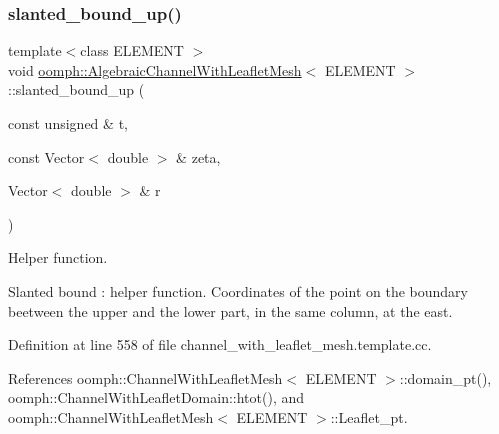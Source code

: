 \mbox{\label{classoomph_1_1AlgebraicChannelWithLeafletMesh_ab3659949ea5faac4ffa981828e98cf53}} 
\subsubsection{\texorpdfstring{slanted\+\_\+bound\+\_\+up()}{slanted\_bound\_up()}}
{\footnotesize\ttfamily template$<$class E\+L\+E\+M\+E\+NT $>$ \\
void \hyperlink{classoomph_1_1AlgebraicChannelWithLeafletMesh}{oomph\+::\+Algebraic\+Channel\+With\+Leaflet\+Mesh}$<$ E\+L\+E\+M\+E\+NT $>$\+::slanted\+\_\+bound\+\_\+up (\begin{DoxyParamCaption}\item[{const unsigned \&}]{t,  }\item[{const Vector$<$ double $>$ \&}]{zeta,  }\item[{Vector$<$ double $>$ \&}]{r }\end{DoxyParamCaption})\hspace{0.3cm}{\ttfamily [protected]}}



Helper function. 

Slanted bound \+: helper function. Coordinates of the point on the boundary beetween the upper and the lower part, in the same column, at the east. 

Definition at line 558 of file channel\+\_\+with\+\_\+leaflet\+\_\+mesh.\+template.\+cc.



References oomph\+::\+Channel\+With\+Leaflet\+Mesh$<$ E\+L\+E\+M\+E\+N\+T $>$\+::domain\+\_\+pt(), oomph\+::\+Channel\+With\+Leaflet\+Domain\+::htot(), and oomph\+::\+Channel\+With\+Leaflet\+Mesh$<$ E\+L\+E\+M\+E\+N\+T $>$\+::\+Leaflet\+\_\+pt.

\mbox{\label{classoomph_1_1AlgebraicChannelWithLeafletMesh_ace3a90b4e530c75bec8301e2291151eb}} 
